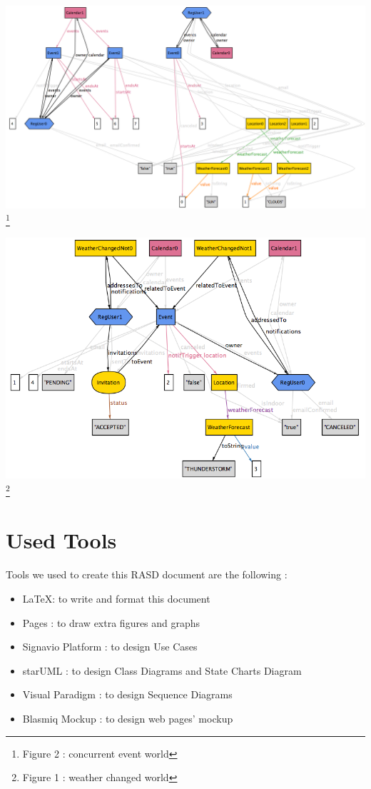 \documentclass[12pt]{book}
\begin{document}
\begin{landscape}
\includegraphics[scale=0.6]{World4}\footnote{Figure 2 :  concurrent event world}\\
\end{landscape}
\begin{landscape}
\includegraphics[scale=0.7]{World5}\footnote{Figure 1 : weather changed world}\\
\end{landscape}



\chapter{Used Tools}

Tools we used to create this RASD document are the following : 
\begin{itemize}
	\item LaTeX: to write and format this document
	\item Pages : to draw extra figures and graphs
	\item Signavio Platform : to design Use Cases
	\item starUML : to design Class Diagrams and State Charts Diagram
	\item Visual Paradigm : to design Sequence Diagrams
	\item Blasmiq Mockup : to design web pages' mockup
	
\end{itemize}
\end{document}

